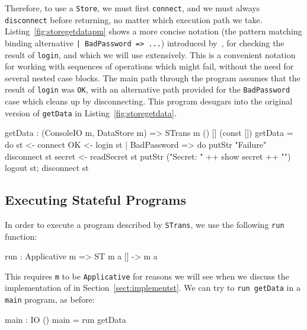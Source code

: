 Therefore, to use a \texttt{Store}, we must first \texttt{connect}, and
we must always \texttt{disconnect} before returning, no matter which
execution path we take.
%
Listing~\ref{fig:storegetdatapm} shows a more concise notation
(the pattern matching binding alternative \texttt{| BadPassword => ...})
introduced by~\citet{brady-tfp14}, for
checking the result of \texttt{login}, and which we will use extensively.
%
This is a convenient notation for working with sequences of operations which
might fail, without the need for several nested case blocks. The main
path through the program assumes that the result of \texttt{login} was
\texttt{OK}, with an alternative path provided for the \texttt{BadPassword}
case which cleans up by disconnecting. This program desugars into the
original version of \texttt{getData} in Listing~\ref{fig:storegetdata}.

\small
\begin{code}[float=h, frame=single,caption={Implementing \texttt{getData}
using the \texttt{DataStore} interface, with a pattern matching bind
alternative},label=fig:storegetdatapm]
getData : (ConsoleIO m, DataStore m) => STrans m () [] (const [])
getData = do st <- connect
             OK <- login st | BadPassword => do putStr "Failure\n"
                                                disconnect st
             secret <- readSecret st
             putStr ("Secret: " ++ show secret ++ "\n")
             logout st; disconnect st
\end{code}
\normalsize


\subsection{Executing Stateful Programs}

\label{sect:implstore}

In order to execute a program described by \texttt{STrans}, we use the
following \texttt{run} function:

\small
\begin{code}
run : Applicative m => ST m a [] -> m a
\end{code}
\normalsize

This requires \texttt{m} to be \texttt{Applicative} for reasons we will see
when we discuss the implementation of \states{} in
Section~\ref{sect:implementst}.  We can try to \texttt{run getData}
in a \texttt{main} program, as before:

\small
\begin{code}
main : IO ()
main = run getData
\end{code}
\normalsize

